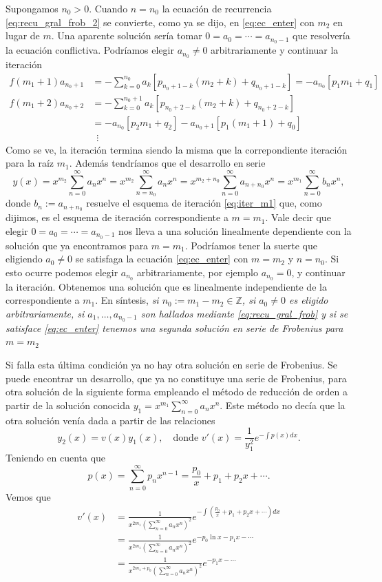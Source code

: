 \documentclass{article}
\newcounter{ejemplo_cont}
\begin{document}
Supongamos $n_0>0$.  Cuando $n=n_0$ la ecuación de recurrencia  \eqref{eq:recu_gral_frob_2} se convierte, como ya se dijo, en \eqref{eq:ec_enter} con $m_2$ en lugar de $m$.\label{pag:apar_sol} Una aparente solución sería tomar  $0=a_0=\cdots=a_{n_0-1}$ que resolvería la ecuación conflictiva. Podríamos elegir $a_{n_0}\neq 0$ arbitrariamente y continuar la iteración
\begin{equation}\label{eq:iter_m1}
  \begin{split}
    f(m_1+1)a_{n_0+1}&=-\sum_{k=0}^{n_0}a_k\left[p_{n_0+1-k}(m_2+k) + q_{n_0+1-k}\right]=-a_{n_0}[p_1m_1+q_1]\\
   f(m_1+2) a_{n_0+2}&=-\sum_{k=0}^{n_0+1}a_k\left[p_{n_0+2-k}(m_2+k) + q_{n_0+2-k}\right]\\
                   &=-a_{n_0}[p_2m_1+q_2]-a_{n_0+1}[p_1(m_1+1)+q_0]\\
                   &\,\,\,\vdots
  \end{split}
\end{equation}
Como se ve, la iteración termina siendo la misma que la correpondiente iteración para la raíz $m_1$. Además tendríamos que el desarrollo en serie
\[y(x)=x^{m_2}\sum_{n=0}^{\infty}a_nx^n=x^{m_2}\sum_{n=n_0}^{\infty}a_nx^n
 =x^{m_2+n_0}\sum_{n=0}^{\infty}a_{n+n_0}x^n
=x^{m_1}\sum_{n=0}^{\infty}b_nx^n
,\]
donde $b_n:=a_{n+n_0}$ resuelve el esquema de iteración \eqref{eq:iter_m1} que, como dijimos, es el esquema de iteración correspondiente a $m=m_1$. Vale decir que elegir  $0=a_0=\cdots=a_{n_0-1}$ nos lleva a una solución linealmente dependiente con la solución que ya encontramos para $m=m_1$. Podríamos tener la suerte que eligiendo $a_0\neq 0$ se satisfaga la ecuación \eqref{eq:ec_enter} con $m=m_2$ y $n=n_0$. Si esto ocurre podemos elegir $a_{n_0}$ arbitrariamente, por ejemplo $a_{n_0}=0$, y continuar la iteración. Obtenemos una solución que es linealmente independiente   de la correspondiente a $m_1$. En síntesis, \emph{si $n_0:=m_1-m_2\in\mathbb{Z}$, si $a_0\neq 0$ es eligido arbitrariamente, si  $a_1,\ldots,a_{n_0-1}$ son hallados mediante \eqref{eq:recu_gral_frob} y si se satisface  \eqref{eq:ec_enter} tenemos una segunda solución en serie de Frobenius para $m=m_2$}

Si falla esta última condición ya no hay otra solución en serie de Frobenius. Se puede encontrar un desarrollo, que ya no constituye una serie de Frobenius,  para otra solución de la siguiente forma empleando el método de reducción de orden a partir de la solución conocida $y_1=x^{m_1}\sum_{n=0}^{\infty}a_nx^n$. Este método no decía que la otra solución venía dada a partir de las relaciones
\[y_2(x)=v(x)y_1(x),\quad\text{donde  } v'(x)=\frac{1}{y_1^2}e^{-\int p(x)dx}.\]  
Teniendo en cuenta que
\[p(x)=\sum_{n=0}^{\infty}p_nx^{n-1}=\frac{p_0}{x}+p_1+p_2x+\cdots.\]
Vemos que
\[
   \begin{split}
     v'(x)&=\frac{1}{x^{2m_1}\left(\sum_{n=0}^{\infty}a_nx^n\right)^2}e^{-\int \left(\frac{p_0}{x}+p_1+p_2x+\cdots \right)dx}\\
  &= \frac{1}{x^{2m_1}\left(\sum_{n=0}^{\infty}a_nx^n\right)^2}e^{-p_0 \ln x -p_1x-\cdots }\\
  &= \frac{1}{x^{2m_1+p_0}\left(\sum_{n=0}^{\infty}a_nx^n\right)^2}e^{ -p_1x-\cdots }
   \end{split}
\]
\end{document}
